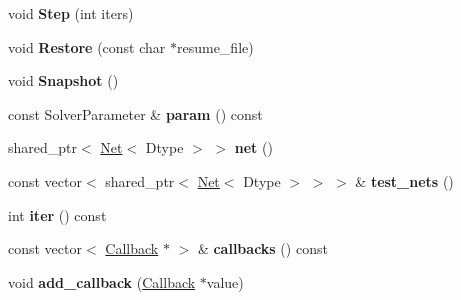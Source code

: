 \begin{DoxyCompactItemize}
\item 
void {\bfseries Step} (int iters)\hypertarget{classcaffe_1_1Solver_a326b27a6807f57edda47d6d4525a823b}{}\label{classcaffe_1_1Solver_a326b27a6807f57edda47d6d4525a823b}

\item 
void {\bfseries Restore} (const char $\ast$resume\+\_\+file)\hypertarget{classcaffe_1_1Solver_ac133985ef686e874f5bd326350d266d8}{}\label{classcaffe_1_1Solver_ac133985ef686e874f5bd326350d266d8}

\item 
void {\bfseries Snapshot} ()\hypertarget{classcaffe_1_1Solver_a54325448a46b2e5d05b8d3c03522c8f7}{}\label{classcaffe_1_1Solver_a54325448a46b2e5d05b8d3c03522c8f7}

\item 
const Solver\+Parameter \& {\bfseries param} () const \hypertarget{classcaffe_1_1Solver_a451a7622491c2ec5fc3f7c0bf9a76656}{}\label{classcaffe_1_1Solver_a451a7622491c2ec5fc3f7c0bf9a76656}

\item 
shared\+\_\+ptr$<$ \hyperlink{classcaffe_1_1Net}{Net}$<$ Dtype $>$ $>$ {\bfseries net} ()\hypertarget{classcaffe_1_1Solver_aed1d6d3b5d8c3bf43dd33464af0c9de1}{}\label{classcaffe_1_1Solver_aed1d6d3b5d8c3bf43dd33464af0c9de1}

\item 
const vector$<$ shared\+\_\+ptr$<$ \hyperlink{classcaffe_1_1Net}{Net}$<$ Dtype $>$ $>$ $>$ \& {\bfseries test\+\_\+nets} ()\hypertarget{classcaffe_1_1Solver_a81216da761d9c24b0b25224d1b77e905}{}\label{classcaffe_1_1Solver_a81216da761d9c24b0b25224d1b77e905}

\item 
int {\bfseries iter} () const \hypertarget{classcaffe_1_1Solver_a8e5aaaf322cbfbe05ac6a3679ff6d7c4}{}\label{classcaffe_1_1Solver_a8e5aaaf322cbfbe05ac6a3679ff6d7c4}

\item 
const vector$<$ \hyperlink{classcaffe_1_1Solver_1_1Callback}{Callback} $\ast$ $>$ \& {\bfseries callbacks} () const \hypertarget{classcaffe_1_1Solver_aa88a1de48096033d8144457e334edcfc}{}\label{classcaffe_1_1Solver_aa88a1de48096033d8144457e334edcfc}

\item 
void {\bfseries add\+\_\+callback} (\hyperlink{classcaffe_1_1Solver_1_1Callback}{Callback} $\ast$value)\hypertarget{classcaffe_1_1Solver_a5c712433c94e24bc0aa26179da5fc3d4}{}\label{classcaffe_1_1Solver_a5c712433c94e24bc0aa26179da5fc3d4}


\end{DoxyCompactItemize}
